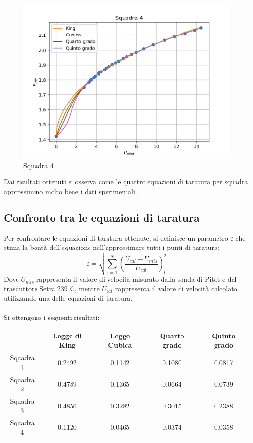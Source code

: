 \begin{figure}[H]
    \centering
    \includegraphics[width=.8\textwidth]{images/8/sq4.png}
    \caption{Squadra 4}
\end{figure}

\noindent Dai risultati ottenuti si osserva come le quattro equazioni di taratura per squadra approssimino molto bene i dati sperimentali.

\newpage
\subsection{Confronto tra le equazioni di taratura}
Per confrontare le equazioni di taratura ottenute, si definisce un parametro $\varepsilon$ che stima la bontà dell'equazione nell'approssimare tutti i punti di taratura:
\begin{equation*}
    \varepsilon = \sqrt{\sum_{i=1}^N\left( \frac{U_{cal}-U_{mis}}{U_{cal}} \right)_i^2}
\end{equation*}
Dove $U_{mis}$ rappresenta il valore di velocità misurato dalla sonda di Pitot e dal trasduttore Setra 239 C, mentre $U_{cal}$ rappresenta il valore di velocità calcolato utilizzando una delle equazioni di taratura.\\\\
Si ottengono i seguenti risultati:
\begin{table}[h]
    \centering
    \begin{tabular}{|c|c|c|c|c|}
    \hline
              & Legge di King & Legge Cubica & Quarto grado & Quinto grado \\ \hline
    Squadra 1 & 0.2492        & 0.1142       & 0.1080       & 0.0817       \\ \hline
    Squadra 2 & 0.4789        & 0.1365       & 0.0664       & 0.0739       \\ \hline
    Squadra 3 & 0.4856        & 0.3282       & 0.3015       & 0.2388       \\ \hline
    Squadra 4 & 0.1120        & 0.0465       & 0.0374       & 0.0358       \\ \hline
    \end{tabular}
\end{table}

